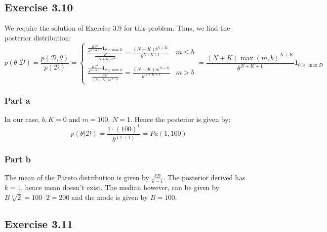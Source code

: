 \documentclass{article}
\begin{document}
\subsection*{Exercise 3.10}
\begin{flushleft}
We require the solution of Exercise 3.9 for this problem. Thus, we find the posterior distribution:
\begin{equation}
p(\theta | \mathcal{D}) = \frac{p(\mathcal{D, \theta})}{p(\mathcal{D})} =
\begin{cases}
\frac{\frac{Kb^{K}}{\theta^{N + K + 1}}\mathbf{1}_{\theta \geq \max{D}}}{\frac{K}{(N + K)b^{N}}} = \frac{(N + K)b^{N+K}}{\theta^{N + K + 1}}& m \leq b\\
\frac{\frac{Kb^{K}}{\theta^{N + K + 1}}\mathbf{1}_{\theta \geq \max{D}}}{\frac{Kb^{K}}{(N + K)m^{N + K}}} = \frac{(N + K)m^{N + K}}{\theta^{N + K + 1}} & m > b
\end{cases} = \frac{(N + K)\max(m, b)^{N + K}}{\theta^{N + K + 1}}\mathbf{1}_{\theta \geq \max{D}}
\end{equation}
\end{flushleft}

\subsubsection*{Part a}
\begin{flushleft}
In our case, \(b, K = 0\) and \(m = 100\), \(N = 1\). Hence the posterior is given by:
\begin{equation}
p(\theta | \mathcal{D}) = \frac{1\cdot(100)^{1}}{\theta^{(1 + 1)}} = Pa(1, 100)
\end{equation}
\end{flushleft}

\subsubsection*{Part b}
\begin{flushleft}
The mean of the Pareto distribution is given by \(\frac{kB}{k - 1}\). The posterior derived has \(k = 1\), hence mean doesn't exist. The median however, can be given by \(B\sqrt[k]{2} = 100 \cdot 2 = 200\) and the mode is given by \(B = 100\).
\end{flushleft}

\subsection*{Exercise 3.11}
\end{document}
